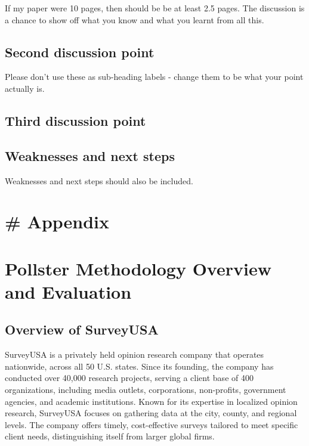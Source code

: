 \documentclass[
  letterpaper,
  DIV=11,
  numbers=noendperiod]{scrartcl}
\begin{document}
If my paper were 10 pages, then should be be at least 2.5 pages. The
discussion is a chance to show off what you know and what you learnt
from all this.

\subsection{Second discussion point}\label{second-discussion-point}

Please don't use these as sub-heading labels - change them to be what
your point actually is.

\subsection{Third discussion point}\label{third-discussion-point}

\subsection{Weaknesses and next steps}\label{weaknesses-and-next-steps}

Weaknesses and next steps should also be included.

\newpage

\appendix

\section*{\# Appendix}\label{appendix}

\section{Pollster Methodology Overview and
Evaluation}\label{pollster-methodology-overview-and-evaluation}

\subsection{\texorpdfstring{Overview of SurveyUSA\\
}{Overview of SurveyUSA }}\label{overview-of-surveyusa}

SurveyUSA is a privately held opinion research company that operates
nationwide, across all 50 U.S. states. Since its founding, the company
has conducted over 40,000 research projects, serving a client base of
400 organizations, including media outlets, corporations, non-profits,
government agencies, and academic institutions. Known for its expertise
in localized opinion research, SurveyUSA focuses on gathering data at
the city, county, and regional levels. The company offers timely,
cost-effective surveys tailored to meet specific client needs,
distinguishing itself from larger global firms.
\end{document}
